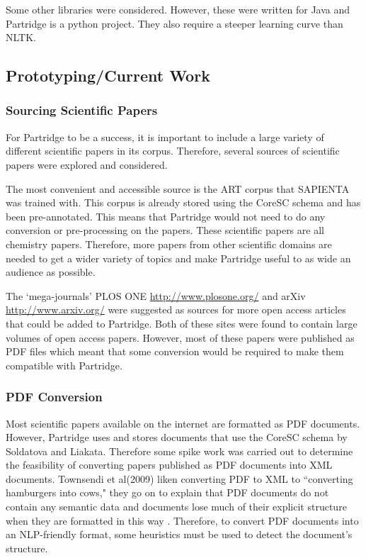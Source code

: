 \documentclass[12pt,a4paper]{article}
\begin{document}
Some other libraries were considered\cite{mallet2002}\cite{cunningham2011text}.
However, these were written for Java and Partridge is a python project. They
also require a steeper learning curve than NLTK. 

\subsection{Prototyping/Current Work}

\subsubsection{ Sourcing Scientific Papers}
For Partridge to be a success, it is important to include a large variety of
different scientific papers in its corpus. Therefore, several sources of
scientific papers were explored and considered.

The most convenient and accessible source is the ART corpus that SAPIENTA was
trained with\cite{citeulike:11077287}. This corpus is already stored using the
CoreSC schema and has been pre-annotated. This means that Partridge would not
need to do any conversion or pre-processing on the papers. These scientific
papers are all chemistry papers. Therefore, more papers from other scientific
domains are needed to get a wider variety of topics and make Partridge useful
to as wide an audience as possible. 

The `mega-journals' PLOS ONE \url{http://www.plosone.org/} and arXiv
\url{http://www.arxiv.org/} were suggested as sources for more open access
articles that could be added to Partridge. Both of these sites were found to
contain large volumes of open access papers. However, most of these papers were
published as PDF files which meant that some conversion would be required to
make them compatible with Partridge.

\subsubsection{PDF Conversion}
Most scientific papers available on the internet are formatted as PDF
documents. However, Partridge uses and stores documents that use the CoreSC
schema by Soldatova and Liakata\cite{liakata2008guidelines}. Therefore some
spike work was carried out to determine the feasibility of converting papers
published as PDF documents into XML documents. Townsendi et al(2009) liken converting
PDF to XML to ``converting hamburgers into cows," they go on to explain that
PDF documents do not contain any semantic data and documents lose much of their
explicit structure when they are formatted in this way \cite{Townsend2009}.
Therefore, to convert PDF documents into an NLP-friendly format, some
heuristics must be used to detect the document's structure\cite{pdfminer}.
\end{document}
